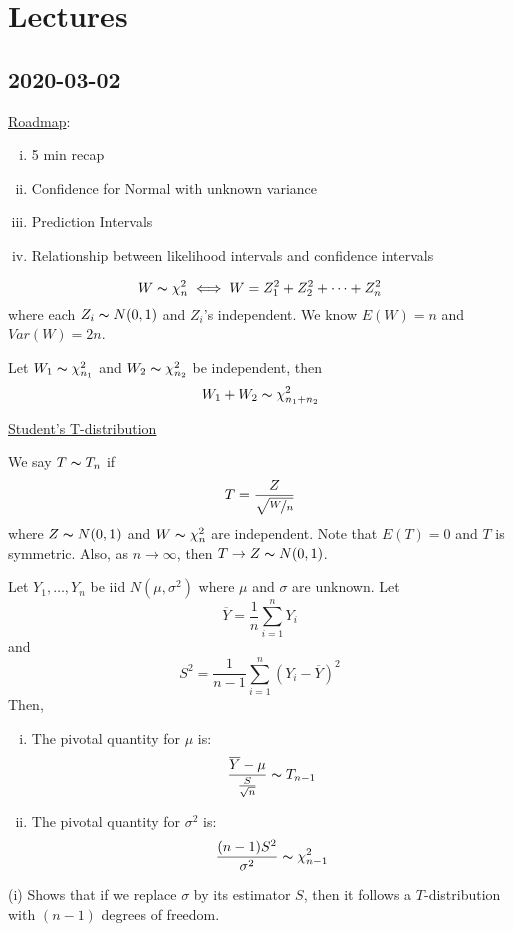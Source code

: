 \chapter{Lectures}
\section{2020-03-02}
\underline{Roadmap}:
\begin{enumerate}[(i)]
    \item 5 min recap
    \item Confidence for Normal with unknown variance
    \item Prediction Intervals
    \item Relationship between likelihood intervals and confidence intervals
\end{enumerate}
\[ W \thicksim \chi^2_n\iff W=Z_1^2+Z_2^2+\cdots+Z_n^2 \]
where each $ Z_i \thicksim N(0,1) $ and $ Z_i $'s independent. We know
$ E(W)=n $ and $ Var(W)=2n $.

Let $ W_1 \thicksim \chi^2_{n_1} $ and $ W_2 \thicksim \chi^2_{n_2} $
be independent, then
\[ W_1+W_2 \thicksim \chi^2_{n_1+n_2} \]

\underline{Student's T-distribution}

We say $ T \thicksim T_n $ if
\[ T=\frac{Z}{\sqrt{\nicefrac{W}{n}}}  \]
where $ Z \thicksim N(0,1) $ and $ W \thicksim \chi^2_n $ are independent. Note
that $ E(T)=0 $ and $ T $ is symmetric. Also, as $ n \to \infty $, then
$ T \to Z \thicksim N(0,1) $.

\begin{thmbox}
    \begin{theorem}
        Let $ Y_1,\ldots ,Y_n $ be iid $ N(\mu,\sigma^2) $ where $ \mu $ and $ \sigma $ are
        unknown. Let
        \[ \overline{Y}=\frac{1}{n} \sum\limits_{i=1}^{n} Y_i \]
        and
        \[ S^2=\frac{1}{n-1} \sum\limits_{i=1}^{n} (Y_i-\overline{Y})^2 \]
        Then,
        \begin{enumerate}[(i)]
            \item The pivotal quantity for $ \mu $ is:
                  \[ \frac{\overline{Y}-\mu}{\frac{S}{\sqrt{n}}} \thicksim T_{n-1}  \]
            \item The pivotal quantity for $ \sigma^2 $ is:
                  \[ \frac{(n-1)S^2}{\sigma^2} \thicksim \chi^2_{n-1}  \]
        \end{enumerate}
    \end{theorem}
\end{thmbox}
\begin{remark}
    (i) Shows that if we replace $ \sigma $ by its estimator $ S $, then it follows a $ T $-distribution
    with $ (n-1) $ degrees of freedom.
\end{remark}

